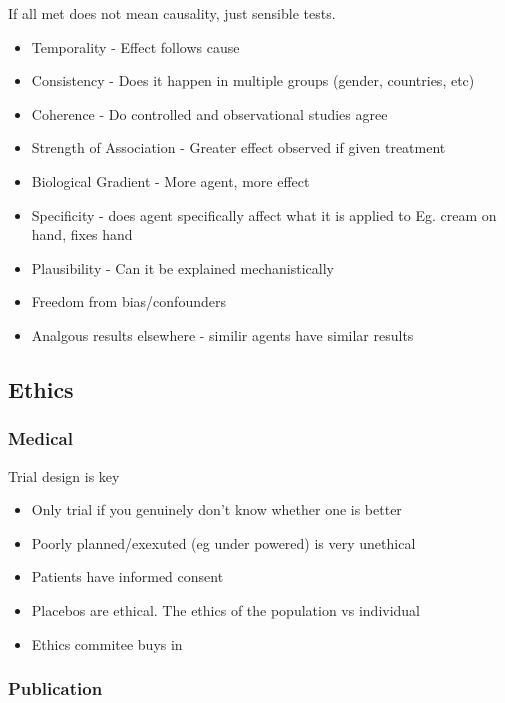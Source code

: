 \documentclass[
  letterpaper,
  DIV=11,
  numbers=noendperiod]{scrreprt}
\providecommand{\tightlist}{%
  \setlength{\itemsep}{0pt}\setlength{\parskip}{0pt}}\usepackage{longtable,booktabs,array}
\begin{document}
If all met does not mean causality, just sensible tests.

\begin{itemize}
\tightlist
\item
  Temporality - Effect follows cause
\item
  Consistency - Does it happen in multiple groups (gender, countries,
  etc)
\item
  Coherence - Do controlled and observational studies agree
\item
  Strength of Association - Greater effect observed if given treatment
\item
  Biological Gradient - More agent, more effect
\item
  Specificity - does agent specifically affect what it is applied to Eg.
  cream on hand, fixes hand
\item
  Plausibility - Can it be explained mechanistically
\item
  Freedom from bias/confounders
\item
  Analgous results elsewhere - similir agents have similar results
\end{itemize}

\hypertarget{ethics}{%
\subsection{Ethics}\label{ethics}}

\hypertarget{medical}{%
\subsubsection{Medical}\label{medical}}

Trial design is key

\begin{itemize}
\tightlist
\item
  Only trial if you genuinely don't know whether one is better
\item
  Poorly planned/exexuted (eg under powered) is very unethical
\item
  Patients have informed consent
\item
  Placebos are ethical. The ethics of the population vs individual
\item
  Ethics commitee buys in
\end{itemize}

\hypertarget{publication}{%
\subsubsection{Publication}\label{publication}}
\end{document}
